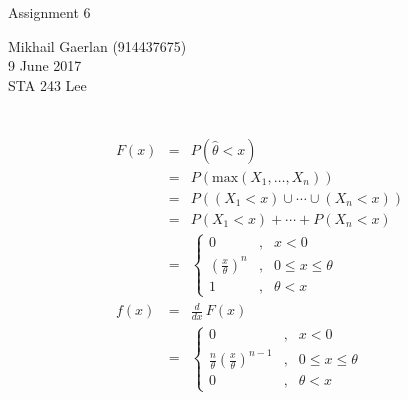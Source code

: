 \documentclass[11pt]{article}
\begin{document}
\begin{multicols}{2}
  \phantom{hello}\vspace{0.01\baselineskip}
  \phantom{hello}\vspace{0.01\baselineskip}
  {\large Assignment 6}\\
  \begin{flushright}
    Mikhail Gaerlan (914437675)\\
    9 June 2017\\
    STA 243 Lee
  \end{flushright}
\end{multicols}
\vspace{-2.3\baselineskip}

\hrulefill

\section{}

\subsection{}

\begin{eqnarray*}
  F\left(x\right)&=&P\left(\hat{\theta}<x\right)\\
                 &=&P\left(\textrm{max}\left(X_1,\ldots,X_n\right)\right)\\
                 &=&P\left(\left(X_1<x\right)\cup\cdots\cup\left(X_n<x\right)\right)\\
                 &=&P\left(X_1<x\right)+\cdots+P\left(X_n<x\right)\\
                 &=&\left\{\begin{array}{ccl}
                             0&,&x<0\\
                             \left(\frac{x}{\theta}\right)^n&,&0\leq x\leq \theta\\
                             1&,&\theta<x
                           \end{array}
                                 \right.\\
  f\left(x\right)&=&\frac{d}{dx}\,F\left(x\right)\\
                 &=&\left\{\begin{array}{ccl}
                             0&,&x<0\\
                             \frac{n}{\theta}\left(\frac{x}{\theta}\right)^{n-1}&,&0\leq x\leq \theta\\
                             0&,&\theta<x
                           \end{array}
                                 \right.\\
\end{eqnarray*}
\end{document}
